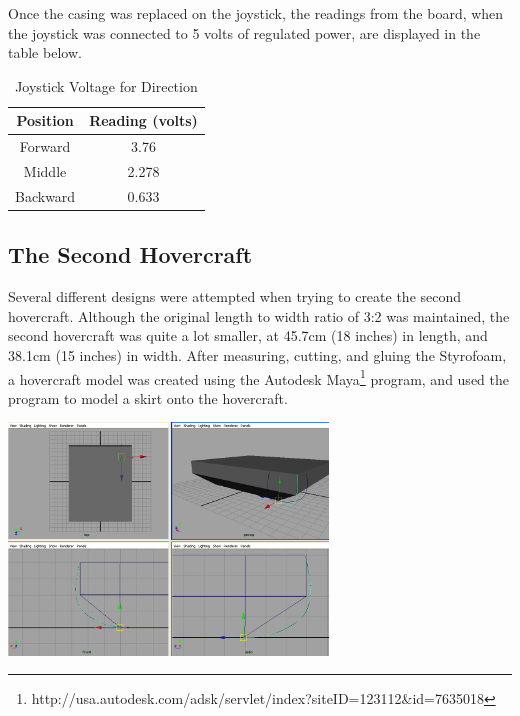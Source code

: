Once the casing was replaced on the joystick, the readings from the board, when the joystick was connected to 5 volts of regulated power, are displayed in the table below.

\begin{table}
\caption{Joystick Voltage for Direction}
\begin{center}
\begin{tabular}{ c c }
  Position & Reading (volts) \\
  \hline
  Forward & 3.76 \\
  Middle & 2.278 \\
  Backward & 0.633 \\
\end{tabular}
\end{center}
\label{voltagePotentiometerTable}
\end{table}

\subsection{The Second Hovercraft}
Several different designs were attempted when trying to create the second hovercraft. Although the original length to width ratio
of 3:2 was maintained, the second hovercraft was quite a lot smaller, at 45.7cm (18 inches) in length, and 38.1cm (15 inches) in width.
After measuring, cutting, and gluing the Styrofoam, a hovercraft model was created using the Autodesk Maya\footnote{ http://usa.autodesk.com/adsk/servlet/index?siteID=123112\&id=7635018 }
program, and used the program to model a skirt onto the hovercraft.

\begin{center}
  \includegraphics[width=85mm]{imageSources/maya.png}
\end{center}
\label{maya}

